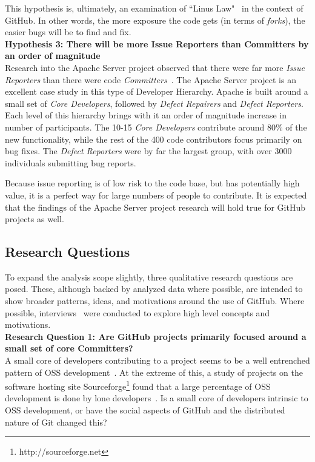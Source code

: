 \documentclass{proc}
\begin{document}
This hypothesis is, ultimately, an examination of ``Linus Law"~\cite{raymond1999cathedral} in the context of GitHub. In other words, the more exposure the code gets (in terms of \emph{forks}), the easier bugs will be to find and fix.\\

\noindent \textbf{Hypothesis 3: There will be more Issue Reporters than Committers by an order of magnitude}\\
Research into the Apache Server project observed that there were far more \emph{Issue Reporters} than there were code \emph{Committers}~\cite{mockus2000case}. The Apache Server project is an excellent case study in this type of Developer Hierarchy. Apache is built around a small set of {\it Core Developers}, followed by {\it Defect Repairers} and {\it Defect Reporters}. Each level of this hierarchy brings with it an order of magnitude increase in number of participants. The 10-15 {\it Core Developers} contribute around 80\% of the new functionality, while the rest of the 400 code contributors focus primarily on bug fixes. The {\it Defect Reporters} were by far the largest group, with over 3000 individuals submitting bug reports.

Because issue reporting is of low risk to the code base, but has potentially high value, it is a perfect way for large numbers of people to contribute. It is expected that the findings of the Apache Server project research will hold true for GitHub projects as well.

\subsection{Research Questions}
To expand the analysis scope slightly, three qualitative research questions are posed. These, although backed by analyzed data where possible, are intended to show broader patterns, ideas, and motivations around the use of GitHub. Where possible, interviews~\cite{begel2013social} were conducted to explore high level concepts and motivations.\\

\noindent \textbf{Research Question 1: Are GitHub projects primarily focused around a small set of core Committers?}\\
A small core of developers contributing to a project seems to be a well entrenched pattern of OSS development~\cite{mockus2000case,mockus2002two,krishnamurthy2002cave}. At the extreme of this, a study of projects on the software hosting site Sourceforge\footnote{http://sourceforge.net} found that a large percentage of OSS development is done by lone developers~\cite{krishnamurthy2002cave}. Is a small core of developers intrinsic to OSS development, or have the social aspects of GitHub and the distributed nature of Git changed this?\\
\end{document}
